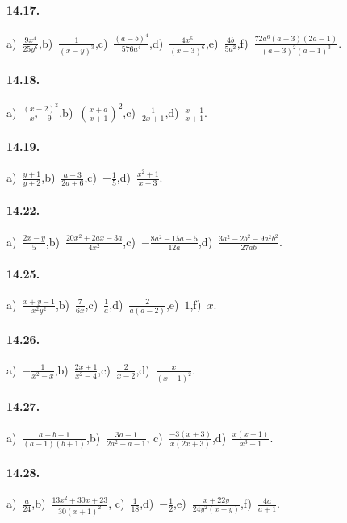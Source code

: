\paragraph{14.17.}
a)~$\frac{9x^{4}}{25y^{6}}$,\quad b)~$\frac{1}{(x-y)^{3}}$,\quad c)~$\frac{(a-b)^{4}}{576a^{4}}$,\quad d)~$\frac{4x^{6}}{(x+3)^{6}}$,\quad e)~$\frac{4b}{5a^{2}}$,\quad f)~$\frac{72a^{6}(a+3)(2a-1)}{(a-3)^{2}(a-1)^{3}}$.

\paragraph{14.18.}
a)~$\frac{(x-2)^{2}}{x^{2}-9}$,\quad b)~$\left(\frac{x+a}{x+1}\right)^{2}$,\quad c)~$\frac{1}{2x+1}$,\quad d)~$\frac{x-1}{x+1}$.

\paragraph{14.19.}
a)~$\frac{y+1}{y+2}$,\quad b)~$\frac{a-3}{2a+6}$,\quad c)~$-{\frac{1}{5}}$,\quad d)~$\frac{x^{2}+1}{x-3}$.

\paragraph{14.22.}
a)~$\frac{2x-y}{5}$,\quad b)~$\frac{20x^{2}+2ax-3a}{4x^{2}}$,\quad c)~$-{\frac{8a^{2}-15a-5}{12a}}$,\quad d)~$\frac{3a^{2}-2b^{2}-9a^{2}b^{2}}{27ab}$.

\paragraph{14.25.}
a)~$\frac{x+y-1}{x^{2}y^{2}}$,\quad b)~$\frac{7}{6x}$,\quad c)~$\frac{1}{a}$,\quad d)~$\frac{2}{a(a-2)}$,\quad e)~$1$,\quad f)~$x$.

\paragraph{14.26.}
a)~$-{\frac{1}{x^{2}-x}}$,\quad b)~$\frac{2x+1}{x^{2}-4}$,\quad c)~$\frac{2}{x-2}$,\quad d)~$\frac{x}{(x-1)^{2}}$.

\paragraph{14.27.}
a)~$\frac{a+b+1}{(a-1)(b+1)}$,\quad b)~$\frac{3a+1}{2a^{2}-a-1}$, \quad c)~$\frac{-3(x+3)}{x(2x+3)}$,\quad d)~$\frac{x(x+1)}{x^{3}-1}$.

\paragraph{14.28.}
a)~$\frac{a}{24}$,\quad b)~$\frac{13x^{2}+30x+23}{30(x+1)^{2}}$, \quad c)~$\frac{1}{18}$,\quad d)~$-\frac{1}{2}$,\quad e)~$\frac{x+22y}{24y^{2}(x+y)}$,\quad f)~$\frac{4a}{a+1}$.

